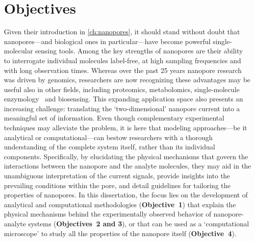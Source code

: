 \chapter{Objectives}
%
\label{ch:objectives}
%



Given their introduction in \cref{ch:nanopores}, it should stand without doubt that nanopores---and biological
ones in particular---have become powerful single-molecular sensing tools. Among the key strengths of nanopores
are their ability to interrogate individual molecules label-free, at high sampling frequencies and with long
observation times. Whereas over the past 25 years nanopore research was driven by genomics, researchers are
now recognizing these advantages may be useful also in other fields, including proteomics, metabolomics,
single-molecule enzymology~\cite{Willems-VanMeervelt-2017} and biosensing. This expanding application space
also presents an increasing challenge: translating the `two-dimensional' nanopore current into a meaningful
set of information. Even though complementary experimental techniques may alleviate the problem, it is here
that modeling approaches---be it analytical or computational---can bestow researchers with a thorough
understanding of the complete system itself, rather than its individual components. Specifically, by
elucidating the physical mechanisms that govern the interactions between the nanopore and the analyte
molecules, they may aid in the unambiguous interpretation of the current signals, provide insights into the
prevailing conditions within the pore, and detail guidelines for tailoring the properties of nanopores. In
this dissertation, the focus lies on the development of analytical and computational methodologies
(\textbf{Objective~1}) that explain the physical mechanisms behind the experimentally observed behavior of
nanopore-analyte systems (\textbf{Objectives~2 and 3}), or that can be used as a `computational microscope' to
study all the properties of the nanopore itself (\textbf{Objective~4}).

\clearpage
%
%

